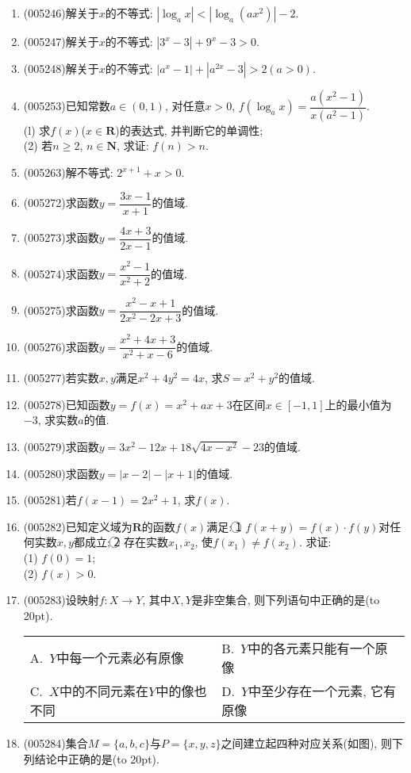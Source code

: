 \documentclass[10pt,a4paper]{article}
\newcommand{\bracket}[1]{(\hbox to #1pt{})}
\newcommand{\twoch}[4]{\par\begin{tabular}{p{.46\textwidth}p{.46\textwidth}}
A.~#1& B.~#2\\
C.~#3& D.~#4
\end{tabular}}
\begin{document}
\begin{enumerate}[1.]
\item {\tiny (005246)}解关于$x$的不等式: $|\log_ax|<|\log_a(ax^2)|-2$.
\item {\tiny (005247)}解关于$x$的不等式: $|3^x-3|+9^x-3>0$.
\item {\tiny (005248)}解关于$x$的不等式: $|a^x-1|+|a^{2x}-3|>2(a>0)$.
\item {\tiny (005253)}已知常数$a\in (0,1)$, 对任意$x>0$, $f(\log_ax)=\dfrac{a(x^2-1)}{x(a^2-1)}$.\\
(l) 求$f(x)$($x\in \mathbf{R}$)的表达式, 并判断它的单调性;\\
(2) 若$n\ge 2$, $n\in \mathbf{N}$, 求证: $f(n)>n$.
\item {\tiny (005263)}解不等式: $2^{x+1}+x>0$.
\item {\tiny (005272)}求函数$y=\dfrac{3x-1}{x+1}$的值域.
\item {\tiny (005273)}求函数$y=\dfrac{4x+3}{2x-1}$的值域.
\item {\tiny (005274)}求函数$y=\dfrac{x^2-1}{x^2+2}$的值域.
\item {\tiny (005275)}求函数$y=\dfrac{x^2-x+1}{2x^2-2x+3}$的值域.
\item {\tiny (005276)}求函数$y=\dfrac{x^2+4x+3}{x^2+x-6}$的值域.
\item {\tiny (005277)}若实数$x,y$满足$x^2+4y^2=4x$, 求$S=x^2+y^2$的值域.
\item {\tiny (005278)}已知函数$y=f(x)=x^2+ax+3$在区间$x\in [-1,1]$上的最小值为$-3$, 求实数$a$的值.
\item {\tiny (005279)}求函数$y=3x^2-12x+18\sqrt {4x-x^2}-23$的值域.
\item {\tiny (005280)}求函数$y=|x-2|-|x+1|$的值域.
\item {\tiny (005281)}若$f(x-1)=2x^2+1$, 求$f(x)$.
\item {\tiny (005282)}已知定义域为$\mathbf{R}$的函数$f(x)$满足:
\textcircled{1} $f(x+y)=f(x)\cdot f(y)$对任何实数$x,y$都成立;
\textcircled{2} 存在实数$x_1,x_2$, 使$f(x_1)\ne f(x_2)$.
求证:\\
(1) $f(0)=1$;\\
(2) $f(x)>0$.
\item {\tiny (005283)}设映射$f:X\to Y$, 其中$X,Y$是非空集合, 则下列语句中正确的是\bracket{20}.
\twoch{$Y$中每一个元素必有原像}{$Y$中的各元素只能有一个原像}{$X$中的不同元素在$Y$中的像也不同}{$Y$中至少存在一个元素, 它有原像}
\item {\tiny (005284)}集合$M=\{a,b,c\}$与$P=\{x,y,z\}$之间建立起四种对应关系(如图), 则下列结论中正确的是\bracket{20}.
\begin{center}

\end{center}
\end{enumerate}
\end{document}
